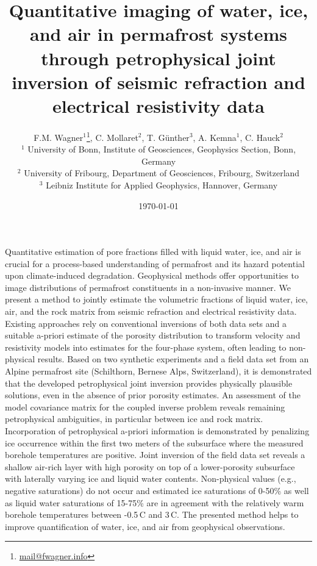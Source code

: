 \documentclass[extra]{gji}
\begin{document}
\title{Quantitative imaging of water, ice, and air in permafrost systems through petrophysical joint inversion of seismic refraction and electrical resistivity data}
\author[Wagner et al.]{F.M. Wagner$^1$\thanks{\href{mailto:mail@fwagner.info}{mail@fwagner.info}}, C. Mollaret$^2$, T. Günther$^3$, A. Kemna$^1$, C. Hauck$^2$\\
 $^1$ University of Bonn, Institute of Geosciences, Geophysics Section, Bonn, Germany\\
 $^2$ University of Fribourg, Department of Geosciences, Fribourg, Switzerland\\
 $^3$ Leibniz Institute for Applied Geophysics, Hannover, Germany
}

\date{\today}
\volume{}
\let\leqslant=\leq

\renewcommand{\thefootnote}{\fnsymbol{footnote}}

\maketitle
\begin{summary}
 Quantitative estimation of pore fractions filled with liquid water, ice, and air is crucial for a process-based understanding of permafrost and its hazard potential upon climate-induced degradation.
 Geophysical methods offer opportunities to image distributions of permafrost constituents in a non-invasive manner.
 We present a method to jointly estimate the volumetric fractions of liquid water, ice, air, and the rock matrix from seismic refraction and electrical resistivity data.
 Existing approaches rely on conventional inversions of both data sets and a suitable a-priori estimate of the porosity distribution to transform velocity and resistivity models into estimates for the four-phase system, often leading to non-physical results.
 Based on two synthetic experiments and a field data set from an Alpine permafrost site (Schilthorn, Bernese Alps, Switzerland), it is demonstrated that the developed petrophysical joint inversion provides physically plausible solutions, even in the absence of prior porosity estimates.
 An assessment of the model covariance matrix for the coupled inverse problem reveals remaining petrophysical ambiguities, in particular between ice and rock matrix.
 Incorporation of petrophysical a-priori information is demonstrated by penalizing ice occurrence within the first two meters of the subsurface where the measured borehole temperatures are positive.
 Joint inversion of the field data set reveals a shallow air-rich layer with high porosity on top of a lower-porosity subsurface with laterally varying ice and liquid water contents.
 Non-physical values (e.g., negative saturations) do not occur and estimated ice saturations of 0-50\% as well as liquid water saturations of 15-75\% are in agreement with the relatively warm borehole temperatures between -0.5\,\textdegree C and 3\,\textdegree C.
 The presented method helps to improve quantification of water, ice, and air from geophysical observations.
\end{summary}
\end{document}
